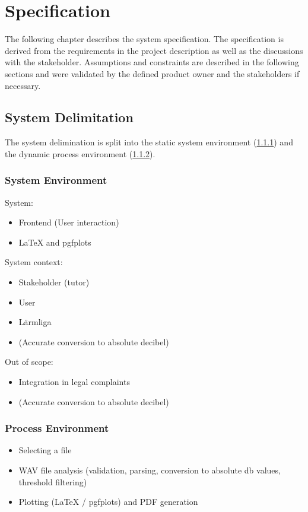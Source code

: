 \section{Specification}
The following chapter describes the system specification. The specification is derived from the requirements in the project description
as well as the discussions with the stakeholder. Assumptions and constraints are described in the following sections and were validated by
the defined product owner and the stakeholders if necessary.

\subsection{System Delimitation}
The system delimination is split into the static system environment (\ref{subsubsec:system_environment})
and the dynamic process environment (\ref{subsubsec:process_environment}).

\subsubsection{System Environment}
\label{subsubsec:system_environment}
System:
\begin{itemize}
    \item Frontend (User interaction)
    \item LaTeX and pgfplots
\end{itemize}
System context:
\begin{itemize}
    \item Stakeholder (tutor)
    \item User
    \item Lärmliga
    \item (Accurate conversion to absolute decibel)
\end{itemize}
Out of scope:
\begin{itemize}
    \item Integration in legal complaints
    \item (Accurate conversion to absolute decibel)
\end{itemize}

\subsubsection{Process Environment}
\label{subsubsec:process_environment}
\begin{itemize}
    \item Selecting a file
    \item WAV file analysis (validation, parsing, conversion to absolute db values, threshold filtering)
    \item Plotting (LaTeX / pgfplots) and PDF generation
\end{itemize}

